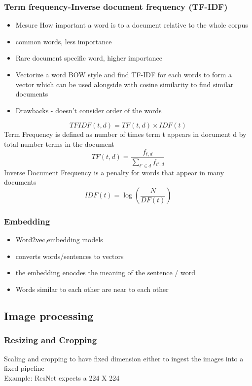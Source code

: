 \documentclass[12pt]{extarticle}
\begin{document}
\subsubsection{Term frequency-Inverse document frequency (TF-IDF)}
\begin{itemize}
    \item Mesure How important a word is to a document relative to the whole corpus
    \item common words, less importance
    \item Rare document specific word, higher importance
    \item Vectorize a word BOW style and find TF-IDF for each words to form a vector
        which can be used alongside with cosine similarity to find similar documents
    \item Drawbacks - doesn't consider order of the words
\end{itemize}
$$
TFIDF(t, d) = TF(t,d) \times IDF(t)
$$
Term Frequency is defined as number of times term t appears in document d by 
total number terms in the document
$$
TF(t, d) = \frac{f_{t,d}}{\sum_{t' \in d} f_{t',d}}
$$
Inverse Document Frequency is a penalty for words that appear in many documents
$$
IDF(t) = \log \left( \frac{N}{DF(t)} \right)
$$

\subsubsection{Embedding}
\begin{itemize}
    \item Word2vec,embedding models
    \item converts words/sentences to vectors
    \item the embedding enocdes the meaning of the sentence / word
    \item Words similar to each other are near to each other
\end{itemize}


\subsection{Image processing}
\subsubsection{Resizing and Cropping}
Scaling and cropping to have fixed dimension either to ingest the images into 
a fixed pipeline \\
Example: ResNet expects a 224 X 224 
\end{document}

